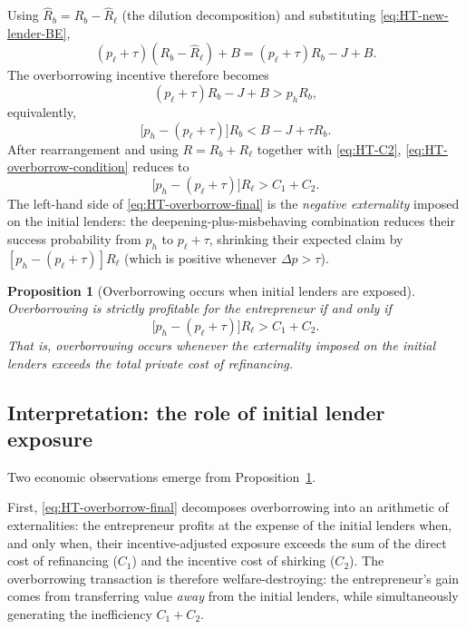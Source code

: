 \documentclass[11pt,a4paper,oneside]{book}
\theoremstyle{plain}
\newtheorem{proposition}[theorem]{Proposition}
\theoremstyle{definition}
\theoremstyle{remark}
\numberwithin{equation}{chapter}
\begin{document}
Using $\widehat{R}_b = R_b - \widehat{R}_\ell$ (the dilution decomposition) and substituting \eqref{eq:HT-new-lender-BE},
\begin{equation*}
  (p_\ell + \tau)(R_b - \widehat{R}_\ell) + B = (p_\ell + \tau) R_b - J + B.
\end{equation*}
The overborrowing incentive therefore becomes
\begin{equation*}
  (p_\ell + \tau) R_b - J + B > p_h R_b,
\end{equation*}
equivalently,
\begin{equation}\label{eq:HT-overborrow-condition}
  \bigl[ p_h - (p_\ell + \tau) \bigr] R_b < B - J + \tau R_b.
\end{equation}
After rearrangement and using $R = R_b + R_\ell$ together with \eqref{eq:HT-C2}, \eqref{eq:HT-overborrow-condition} reduces to
\begin{equation}\label{eq:HT-overborrow-final}
  \bigl[ p_h - (p_\ell + \tau) \bigr] R_\ell > C_1 + C_2.
\end{equation}
The left-hand side of \eqref{eq:HT-overborrow-final} is the \emph{negative externality} imposed on the initial lenders: the deepening-plus-misbehaving combination reduces their success probability from $p_h$ to $p_\ell + \tau$, shrinking their expected claim by $[p_h - (p_\ell + \tau)] R_\ell$ (which is positive whenever $\Delta p > \tau$).

\begin{proposition}[Overborrowing occurs when initial lenders are exposed]\label{prop:overborrow}
Overborrowing is strictly profitable for the entrepreneur if and only if
\begin{equation*}
  \bigl[ p_h - (p_\ell + \tau) \bigr] R_\ell > C_1 + C_2.
\end{equation*}
That is, overborrowing occurs whenever the externality imposed on the initial lenders exceeds the total private cost of refinancing.
\end{proposition}

\subsection{Interpretation: the role of initial lender exposure}

Two economic observations emerge from Proposition~\ref{prop:overborrow}.

First, \eqref{eq:HT-overborrow-final} decomposes overborrowing into an arithmetic of externalities: the entrepreneur profits at the expense of the initial lenders when, and only when, their incentive-adjusted exposure exceeds the sum of the direct cost of refinancing ($C_1$) and the incentive cost of shirking ($C_2$).
The overborrowing transaction is therefore welfare-destroying: the entrepreneur's gain comes from transferring value \emph{away} from the initial lenders, while simultaneously generating the inefficiency $C_1 + C_2$.
\end{document}
